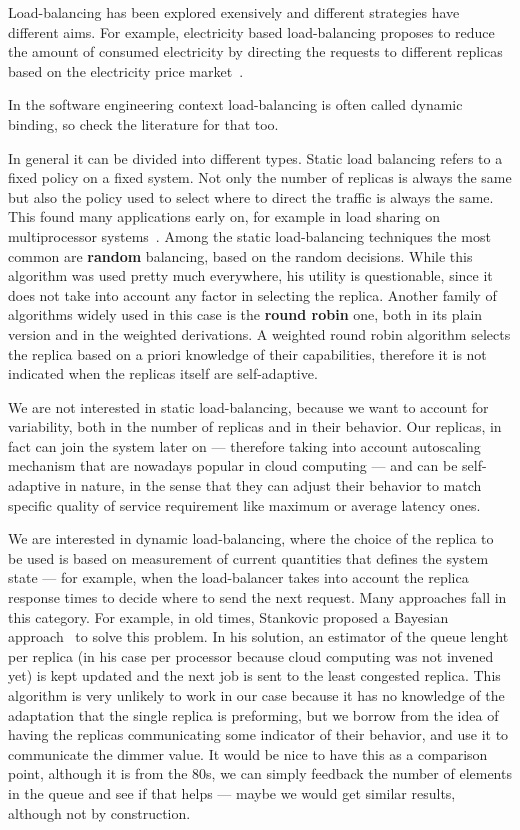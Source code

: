 Load-balancing has been explored exensively and different strategies
have different aims. For example, electricity based load-balancing
proposes to reduce the amount of consumed electricity by directing the
requests to different replicas based on the electricity price
market~\cite{LoadBalancingForElectricity:TCC}.

In the software engineering context load-balancing is often called
dynamic binding, so check the literature for that too.

In general it can be divided into different types. Static load
balancing refers to a fixed policy on a fixed system. Not only the
number of replicas is always the same but also the policy used to
select where to direct the traffic is always the same. This found many
applications early on, for example in load sharing on multiprocessor
systems~\cite{StaticLoadBalancing:TSE,StaticOptimal:ACM}. Among the
static load-balancing techniques the most common are \textbf{random}
balancing, based on the random decisions. While this algorithm was
used pretty much everywhere, his utility is questionable, since it
does not take into account any factor in selecting the
replica. Another family of algorithms widely used in this case is the
\textbf{round robin} one, both in its plain version and in the
weighted derivations. A weighted round robin algorithm selects the
replica based on a priori knowledge of their capabilities, therefore
it is not indicated when the replicas itself are self-adaptive.
 
We are not interested in static load-balancing, because we want to
account for variability, both in the number of replicas and in their
behavior. Our replicas, in fact can join the system later on ---
therefore taking into account autoscaling mechanism that are nowadays
popular in cloud computing --- and can be self-adaptive in nature, in
the sense that they can adjust their behavior to match specific
quality of service requirement like maximum or average latency
ones. 

We are interested in dynamic load-balancing, where the choice of the
replica to be used is based on measurement of current quantities that
defines the system state --- for example, when the load-balancer takes
into account the replica response times to decide where to send the
next request. Many approaches fall in this category. For example, in
old times, Stankovic proposed a Bayesian approach~\cite{Stankovic:TC}
to solve this problem. In his solution, an estimator of the queue
lenght per replica (in his case per processor because cloud computing
was not invened yet) is kept updated and the next job is sent to the
least congested replica. This algorithm is very unlikely to work in
our case because it has no knowledge of the adaptation that the single
replica is preforming, but we borrow from the idea of having the
replicas communicating some indicator of their behavior, and use it to
communicate the dimmer value. It would be nice to have this as a
comparison point, although it is from the 80s, we can simply feedback
the number of elements in the queue and see if that helps --- maybe we
would get similar results, although not by construction.


